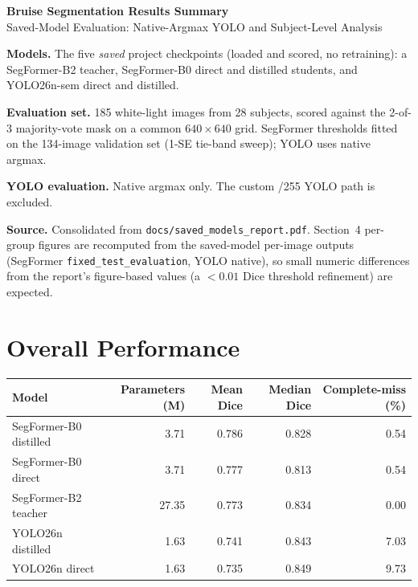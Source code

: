 \documentclass[11pt]{article}
\begin{document}
\begin{center}
  {\LARGE\bfseries Bruise Segmentation Results Summary}\\[4pt]
  {\large Saved-Model Evaluation: Native-Argmax YOLO and Subject-Level Analysis}
\end{center}

\vspace{4pt}

\textbf{Models.} The five \emph{saved} project checkpoints (loaded and scored, no
retraining): a SegFormer-B2 teacher, SegFormer-B0 direct and distilled students, and
YOLO26n-sem direct and distilled.

\textbf{Evaluation set.} 185 white-light images from 28 subjects, scored against the
2-of-3 majority-vote mask on a common $640\times640$ grid. SegFormer thresholds fitted on
the 134-image validation set (1-SE tie-band sweep); YOLO uses native argmax.

\textbf{YOLO evaluation.} Native argmax only. The custom /255 YOLO path is excluded.

\textbf{Source.} Consolidated from \texttt{docs/saved\_models\_report.pdf}. Section~4
per-group figures are recomputed from the saved-model per-image outputs
(SegFormer \texttt{fixed\_test\_evaluation}, YOLO native), so small numeric differences
from the report's figure-based values (a $<0.01$ Dice threshold refinement) are expected.

\section{Overall Performance}

\begin{center}
\begin{tabular}{l R R R R}
\toprule
Model & Parameters (M) & Mean Dice & Median Dice & Complete-miss (\%) \\
\midrule
SegFormer-B0 distilled   & 3.71  & 0.786 & 0.828 & 0.54 \\
SegFormer-B0 direct      & 3.71  & 0.777 & 0.813 & 0.54 \\
SegFormer-B2 teacher     & 27.35 & 0.773 & 0.834 & 0.00 \\
YOLO26n distilled        & 1.63  & 0.741 & 0.843 & 7.03 \\
YOLO26n direct           & 1.63  & 0.735 & 0.849 & 9.73 \\
\bottomrule
\end{tabular}
\end{center}
\end{document}
